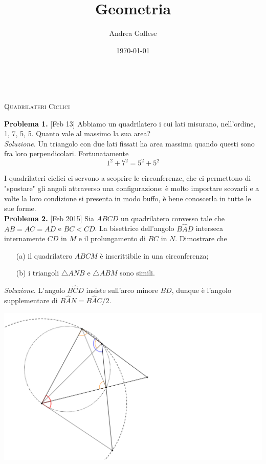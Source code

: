 \documentclass[a4paper]{article}
\title{Geometria}\let\Title\@title
\author{Andrea Gallese}\let\Author\@author
\date{\today}\let\Date\@date
\newcommand{\Intitola}{\begin{center}
		\vspace*{0,5 cm}
		{\Huge \textsc{\Title}} \\
		\vspace{0,5 cm}
		\textsc{\Author} \hspace{1cm} \textsc{\Date}
		\thispagestyle{empty}
		\vspace{0,7 cm}
\end{center}}
\theoremstyle{remark}
\theoremstyle{definition}
\begin{document}
\Intitola
\small
\begin{multicols}{2}
\begin{center}
	\textsc{Quadrilateri Ciclici}
\end{center}

\textbf{Problema 1.} [Feb 13] Abbiamo un quadrilatero i cui lati misurano, nell’ordine, 1, 7, 5, 5. Quanto vale al massimo la sua area? \\

\emph{Soluzione.} Un triangolo con due lati fissati ha area massima quando questi sono fra loro perpendicolari. Fortunatamente \[ 1^2 + 7^2 = 5^2 + 5^2 \]
	
\textsf{I quadrilateri ciclici ci servono a scoprire le circonferenze, che ci permettono di "spostare" gli angoli attraverso una configurazione: è molto importare scovarli e a volte la loro condizione si presenta in modo buffo, è bene conoscerla in tutte le sue forme.} \\

\textbf{Problema 2.} [Feb 2015] Sia $ ABCD $ un quadrilatero convesso tale che $ AB = AC = AD $ e $ BC < CD $. La bisettrice dell’angolo $ B\hat{A}D $ interseca internamente $ CD $ in $ M $ e il prolungamento di $ BC $ in $ N $. Dimostrare che
\begin{itemize}
	\item [(a)] il quadrilatero $ ABCM $ è inscrittibile in una circonferenza;
	\item [(b)] i triangoli $ \bigtriangleup ANB $ e $ \bigtriangleup ABM $ sono simili.
\end{itemize}


\emph{Soluzione.} L'angolo $ B\hat{C}D $ insiste sull'arco minore $ BD $, dunque è l'angolo supplementare di $ B\hat{A}N = B\hat{A}C / 2 $.

\begin{center}
	\includegraphics[scale=0.2]{baah}
\end{center}


\end{multicols}
\end{document}
